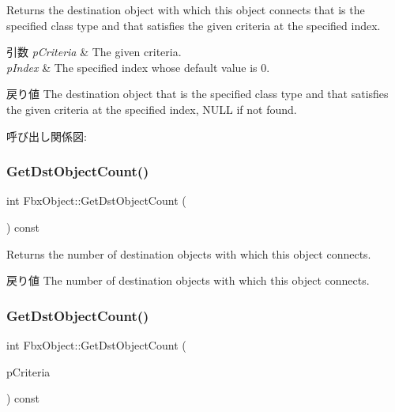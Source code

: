 Returns the destination object with which this object connects that is the specified class type and that satisfies the given criteria at the specified index. 
\begin{DoxyParams}{引数}
{\em p\+Criteria} & The given criteria. \\
\hline
{\em p\+Index} & The specified index whose default value is 0. \\
\hline
\end{DoxyParams}
\begin{DoxyReturn}{戻り値}
The destination object that is the specified class type and that satisfies the given criteria at the specified index, N\+U\+LL if not found. 
\end{DoxyReturn}
呼び出し関係図\+:
\mbox{\label{class_fbx_object_a5be091701bfa94643dc2333768f56866}} 
\subsubsection{\texorpdfstring{Get\+Dst\+Object\+Count()}{GetDstObjectCount()}\hspace{0.1cm}{\footnotesize\ttfamily [1/4]}}
{\footnotesize\ttfamily int Fbx\+Object\+::\+Get\+Dst\+Object\+Count (\begin{DoxyParamCaption}{ }\end{DoxyParamCaption}) const}

Returns the number of destination objects with which this object connects. \begin{DoxyReturn}{戻り値}
The number of destination objects with which this object connects. 
\end{DoxyReturn}
\mbox{\label{class_fbx_object_a46183e2905f10779c57389dc4ec3a5de}} 
\subsubsection{\texorpdfstring{Get\+Dst\+Object\+Count()}{GetDstObjectCount()}\hspace{0.1cm}{\footnotesize\ttfamily [2/4]}}
{\footnotesize\ttfamily int Fbx\+Object\+::\+Get\+Dst\+Object\+Count (\begin{DoxyParamCaption}\item[{const \hyperlink{class_fbx_criteria}{Fbx\+Criteria} \&}]{p\+Criteria }\end{DoxyParamCaption}) const}

